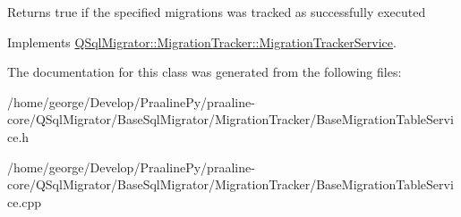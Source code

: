 \begin{DoxyReturn}{Returns}
true if the specified migrations was tracked as successfully executed 
\end{DoxyReturn}


Implements \hyperlink{class_q_sql_migrator_1_1_migration_tracker_1_1_migration_tracker_service_a8bb56a82aeefab574a0d7eb2dd5112e5}{Q\+Sql\+Migrator\+::\+Migration\+Tracker\+::\+Migration\+Tracker\+Service}.



The documentation for this class was generated from the following files\+:\begin{DoxyCompactItemize}
\item 
/home/george/\+Develop/\+Praaline\+Py/praaline-\/core/\+Q\+Sql\+Migrator/\+Base\+Sql\+Migrator/\+Migration\+Tracker/Base\+Migration\+Table\+Service.\+h\item 
/home/george/\+Develop/\+Praaline\+Py/praaline-\/core/\+Q\+Sql\+Migrator/\+Base\+Sql\+Migrator/\+Migration\+Tracker/Base\+Migration\+Table\+Service.\+cpp\end{DoxyCompactItemize}
